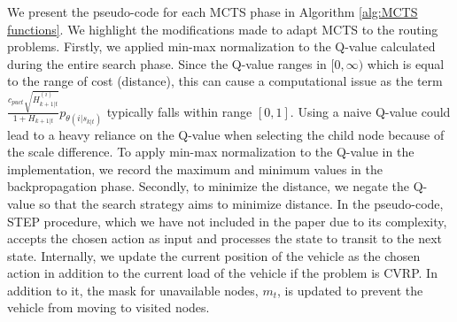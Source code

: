 \documentclass{article}
\begin{document}
We present the pseudo-code for each MCTS phase in Algorithm \ref{alg:MCTS functions}.
We highlight the modifications made to adapt MCTS to the routing problems. Firstly, we applied min-max normalization to the Q-value calculated during the entire search phase.
Since the Q-value ranges in $[0, \infty)$ which is equal to the range of cost (distance), this can cause a computational issue as the term $\frac{c_{puct}\sqrt{H^{(i)}_{k+1|t}}}{1 + H_{k+1|t}}p_{\theta(i| s_{k|t})}$ typically falls within range $[0, 1]$. Using a naive Q-value could lead to a heavy reliance on the Q-value when selecting the child node because of the scale difference.
To apply min-max normalization to the Q-value in the implementation, we record the maximum and minimum values in the backpropagation phase.
Secondly, to minimize the distance, we negate the Q-value so that the search strategy aims to minimize distance. In the pseudo-code, STEP procedure, which we have not included in the paper due to its complexity, accepts the chosen action as input and processes the state to transit to the next state. Internally, we update the current position of the vehicle as the chosen action in addition to the current load of the vehicle if the problem is CVRP. In addition to it, the mask for unavailable nodes, $m_t$, is updated to prevent the vehicle from moving to visited nodes.
\end{document}
